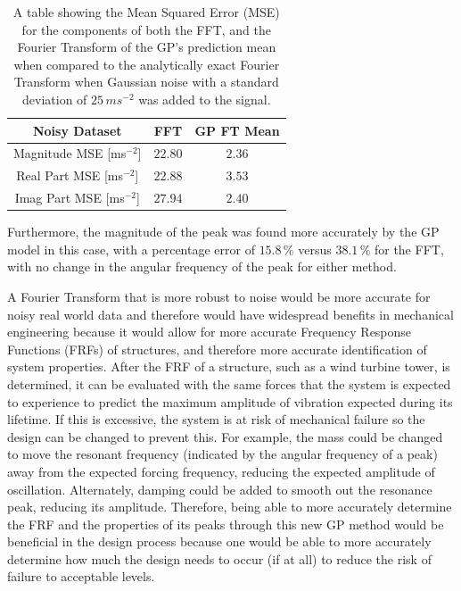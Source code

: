\documentclass[12pt]{article}
\begin{document}
    \begin{table}[h]
        \centering %
        \setlength{\arrayrulewidth}{1pt} %
        \begin{tabular}{|c|c|c|} %
            \hline
            Noisy Dataset & FFT & GP FT Mean \\ %
            \hline
            Magnitude MSE [ms$^{-2}$] & $22.80$ & $2.36$ \\
            \hline
            Real Part MSE [ms$^{-2}$] & $22.88$ & $3.53$ \\
            \hline
            Imag Part MSE [ms$^{-2}$] & $27.94$ & $2.40$ \\
            \hline
        \end{tabular}
        \caption{A table showing the Mean Squared Error (MSE) for the components of both the FFT, and the Fourier Transform of the GP's prediction mean when compared to the analytically exact Fourier Transform when Gaussian noise with a standard deviation of $25 \, ms^{-2}$ was added to the signal.}
        \label{tab:response-noise}
    \end{table}

    Furthermore, the magnitude of the peak was found more accurately by the GP model in this case, with a percentage error of $15.8 \, \%$ versus $38.1 \, \%$ for the FFT, with no change in the angular frequency of the peak for either method.

    A Fourier Transform that is more robust to noise would be more accurate for noisy real world data and therefore would have widespread benefits in mechanical engineering because it would allow for more accurate Frequency Response Functions (FRFs) of structures, and therefore more accurate identification of system properties.
    After the FRF of a structure, such as a wind turbine tower, is determined, it can be evaluated with the same forces that the system is expected to experience to predict the maximum amplitude of vibration expected during its lifetime.
    If this is excessive, the system is at risk of mechanical failure so the design can be changed to prevent this.
    For example, the mass could be changed to move the resonant frequency (indicated by the angular frequency of a peak) away from the expected forcing frequency, reducing the expected amplitude of oscillation.
    Alternately, damping could be added to smooth out the resonance peak, reducing its amplitude.
    Therefore, being able to more accurately determine the FRF and the properties of its peaks through this new GP method would be beneficial in the design process because one would be able to more accurately determine how much the design needs to occur (if at all) to reduce the risk of failure to acceptable levels.
\end{document}
